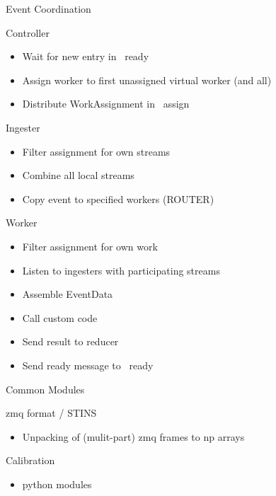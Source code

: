 \documentclass[aspectratio=169]{beamer}
\begin{document}
\begin{frame}{Event Coordination}
\begin{block}{Controller}
\begin{itemize}
 \item Wait for new entry in \faDatabase\ ready
 \item Assign worker to first unassigned virtual worker (and all)
 \item Distribute WorkAssignment in \faDatabase\ assign
\end{itemize}
\end{block}

\begin{minipage}[t]{0.49\textwidth}
 \begin{block}{Ingester}
  \begin{itemize}
   \item Filter assignment for own streams
   \item Combine all local streams
   \item Copy event to specified workers (ROUTER)
  \end{itemize}

 \end{block}

\end{minipage}
\begin{minipage}[t]{0.49\textwidth}
 \begin{block}{Worker}
  \begin{itemize}
   \item Filter assignment for own work
   \item Listen to ingesters with participating streams
   \item Assemble EventData
   \item Call custom code
   \item Send result to reducer
   \item Send ready message to \faDatabase\ ready
  \end{itemize}

 \end{block}

\end{minipage}

\end{frame}

\begin{frame}{Common Modules}
 \begin{block}{zmq format / STINS}
  \begin{itemize}
   \item Unpacking of (mulit-part) zmq frames to np arrays
  \end{itemize}
 \end{block}
 
  \begin{block}{Calibration}
\begin{itemize}
 \item python modules
\end{itemize}

\end{block}

 
\end{frame}
\end{document}
